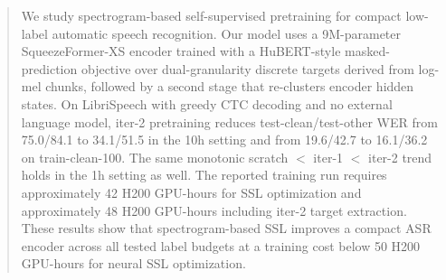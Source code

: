 \documentclass{article}
\begin{document}

\printAffiliationsAndNotice{}

\begin{abstract}
We study spectrogram-based self-supervised pretraining for compact
low-label automatic speech recognition. Our model uses a 9M-parameter
SqueezeFormer-XS encoder trained with a HuBERT-style masked-prediction
objective over dual-granularity discrete targets derived from log-mel
chunks, followed by a second stage that re-clusters encoder hidden
states. On LibriSpeech with greedy CTC decoding and no external language
model, iter-2 pretraining reduces test-clean/test-other WER from
75.0/84.1 to 34.1/51.5 in the 10h setting and from 19.6/42.7 to
16.1/36.2 on train-clean-100. The same monotonic scratch
$<$ iter-1 $<$ iter-2 trend holds in the 1h setting as well. The reported
training run requires approximately 42 H200 GPU-hours for SSL
optimization and approximately 48 H200 GPU-hours including iter-2 target
extraction. These results show that spectrogram-based SSL improves a compact
ASR encoder across all tested label budgets at a training cost below 50
H200 GPU-hours for neural SSL optimization.
\end{abstract}
\end{document}
